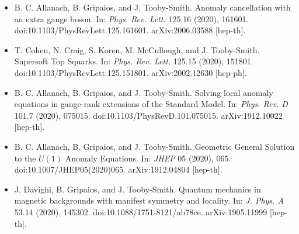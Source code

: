 \documentclass[14pt,letter]{article}
\newcommand{\includePublications}{T} %
\newcommand{\mybullet}{\textcolor{mycolor}{$\ast$}\ }
\newcounter{customtitle}
\begin{document}
\begin{itemize}[label=\mybullet]
\item B. C. Allanach, B. Gripaios, and J. Tooby-Smith. {\color{mycolor} Anomaly cancellation with an extra gauge boson}. In: \emph{Phys. Rev. Lett.} 125.16 (2020), 161601. doi:10.1103/PhysRevLett.125.161601. arXiv:2006.03588 [hep-th].

\item T. Cohen, N. Craig, S. Koren, M. McCullough, and J. Tooby-Smith. {\color{mycolor} Supersoft Top Squarks}. In: \emph{Phys. Rev. Lett.} 125.15 (2020), 151801. doi:10.1103/PhysRevLett.125.151801. arXiv:2002.12630 [hep-ph].

\item B. C. Allanach, B. Gripaios, and J. Tooby-Smith. {\color{mycolor} Solving local anomaly equations in gauge-rank extensions of the Standard Model}. In: \emph{Phys. Rev. D} 101.7 (2020), 075015. doi:10.1103/PhysRevD.101.075015. arXiv:1912.10022 [hep-th].

\item B. C. Allanach, B. Gripaios, and J. Tooby-Smith. {\color{mycolor} Geometric General Solution to the $U(1)$ Anomaly Equations}. In: \emph{JHEP} 05 (2020), 065. doi:10.1007/JHEP05(2020)065. arXiv:1912.04804 [hep-th].

\item J. Davighi, B. Gripaios, and J. Tooby-Smith. {\color{mycolor} Quantum mechanics in magnetic backgrounds with manifest symmetry and locality}. In: \emph{J. Phys. A} 53.14 (2020), 145302. doi:10.1088/1751-8121/ab78ce. arXiv:1905.11999 [hep-th].
\end{itemize}




%


%
\end{document}
